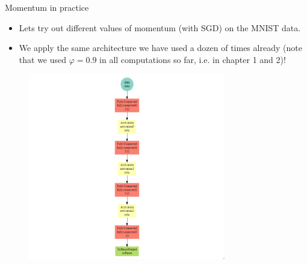 \begin{vbframe}{Momentum in practice}
  \begin{minipage}{0.5\textwidth}
  \begin{itemize}
    \item Lets try out different values of momentum (with SGD) on the MNIST data.
    \item We apply the same architecture we have used a dozen of times already (note that we used $\varphi = 0.9$ in all computations so far, i.e. in chapter 1 and 2)!
  \end{itemize}
  \end{minipage}
  \begin{minipage}{0.3\textwidth}


  \begin{figure}
  \begin{flushleft}
      \includegraphics[width=8.6cm]{figure/mxnet_graph.png}
    \end{flushleft}
  \end{figure}
\end{minipage}
\end{vbframe}
